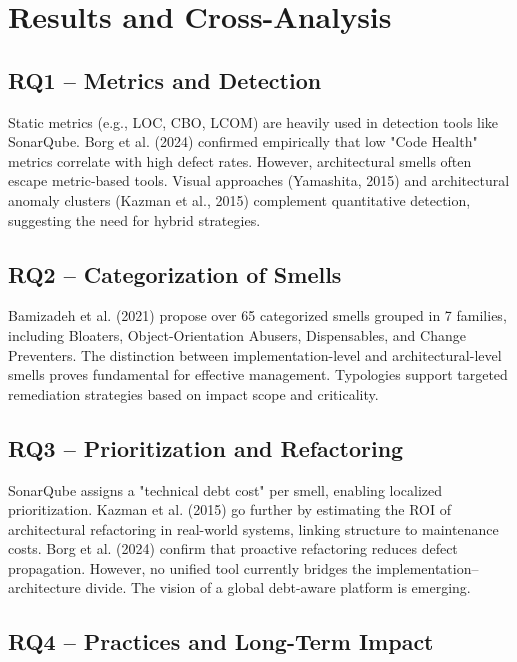 
\section{Results and Cross-Analysis}

\subsection{RQ1 – Metrics and Detection}

Static metrics (e.g., LOC, CBO, LCOM) are heavily used in detection tools like SonarQube. 
Borg et al. (2024) confirmed empirically that low "Code Health" metrics correlate with high defect rates. 
However, architectural smells often escape metric-based tools. Visual approaches (Yamashita, 2015) and architectural anomaly clusters (Kazman et al., 2015) complement quantitative detection, suggesting the need for hybrid strategies.

\subsection{RQ2 – Categorization of Smells}

Bamizadeh et al. (2021) propose over 65 categorized smells grouped in 7 families, including Bloaters, Object-Orientation Abusers, Dispensables, and Change Preventers. The distinction between implementation-level and architectural-level smells proves fundamental for effective management. Typologies support targeted remediation strategies based on impact scope and criticality.

\subsection{RQ3 – Prioritization and Refactoring}

SonarQube assigns a "technical debt cost" per smell, enabling localized prioritization. 
Kazman et al. (2015) go further by estimating the ROI of architectural refactoring in real-world systems, linking structure to maintenance costs. 
Borg et al. (2024) confirm that proactive refactoring reduces defect propagation. 
However, no unified tool currently bridges the implementation–architecture divide. The vision of a global debt-aware platform is emerging.

\subsection{RQ4 – Practices and Long-Term Impact}

